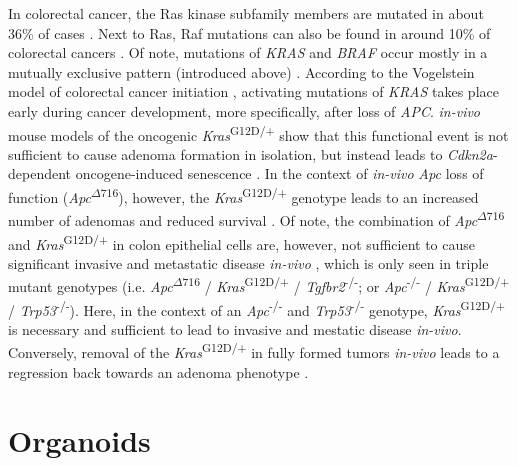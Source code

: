 \begin{flushleft}
In colorectal cancer, the Ras kinase subfamily members are mutated in about 36\% of cases \parencite{fangMAPKSignallingPathways2005}. Next to Ras, Raf mutations can also be found in around 10\% of colorectal cancers \parencite{fangMAPKSignallingPathways2005}. Of note, mutations of \textit{KRAS} and \textit{BRAF} occur mostly in a mutually exclusive pattern (introduced above) \parencite{fangMAPKSignallingPathways2005, minaConditionalSelectionGenomic2017}. According to the Vogelstein model of colorectal cancer initiation \parencite{fearonMolecularGeneticsColorectal2011}, activating mutations of \textit{KRAS} takes place early during cancer development, more specifically, after loss of \textit{APC}. \textit{in-vivo} mouse models of the oncogenic \textit{Kras}\textsuperscript{G12D/+} show that this functional event is not sufficient to cause adenoma formation in isolation, but instead leads to \textit{Cdkn2a}-dependent oncogene-induced senescence \parencite{benneckeInk4aArfOncogeneinduced2010}. In the context of \textit{in-vivo} \textit{Apc} loss of function (\textit{Apc}\textsuperscript{$\Delta716$}), however, the \textit{Kras}\textsuperscript{G12D/+} genotype leads to an increased number of adenomas and reduced survival \parencite{sakaiCombinedMutationApc2018a}. Of note, the combination of \textit{Apc}\textsuperscript{$\Delta716$} and \textit{Kras}\textsuperscript{G12D/+} in colon epithelial cells are, however, not sufficient to cause significant invasive and metastatic disease \textit{in-vivo} \parencite{sakaiCombinedMutationApc2018a, boutinOncogenicKrasDrives2017a}, which is only seen in triple mutant genotypes (i.e. \textit{Apc}\textsuperscript{$\Delta716$} / \textit{Kras}\textsuperscript{G12D/+} / \textit{Tgfbr2}\textsuperscript{-/-}; or \textit{Apc}\textsuperscript{-/-} / \textit{Kras}\textsuperscript{G12D/+} / \textit{Trp53}\textsuperscript{-/-}). Here, in the context of an \textit{Apc}\textsuperscript{-/-} and \textit{Trp53}\textsuperscript{-/-} genotype, \textit{Kras}\textsuperscript{G12D/+} is necessary and sufficient to lead to invasive and mestatic disease \textit{in-vivo}. Conversely, removal of the \textit{Kras}\textsuperscript{G12D/+} in fully formed tumors \textit{in-vivo} leads to a regression back towards an adenoma phenotype \parencite{boutinOncogenicKrasDrives2017a}.



\section{Organoids}


\end{flushleft}
